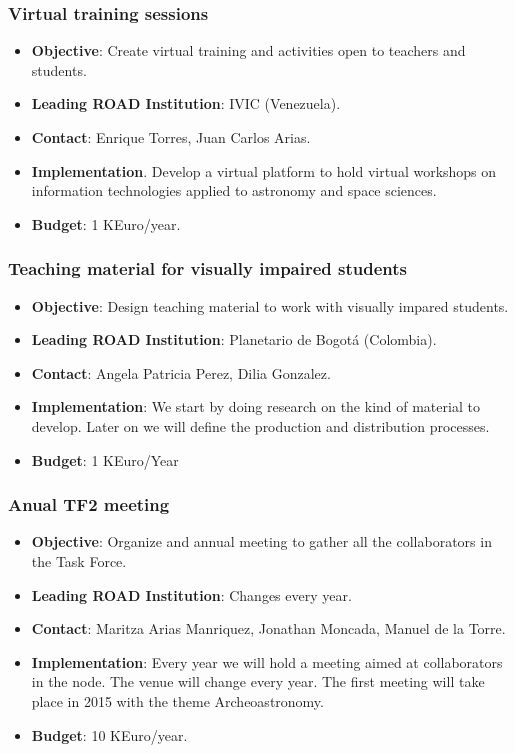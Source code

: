 \documentclass[12pt]{article}
\begin{document}
\subsubsection{Virtual training sessions}
\begin{itemize}
\item {\bf Objective}: Create virtual training and activities open to
  teachers and students. 
\item {\bf Leading ROAD Institution}: IVIC (Venezuela).
\item {\bf Contact}: Enrique Torres, Juan Carlos Arias.
\item {\bf Implementation}. Develop a virtual platform to hold virtual
  workshops on information technologies applied to astronomy and space
  sciences.
\item {\bf Budget}: 1 KEuro/year.
\end{itemize}

\subsubsection{Teaching material for visually impaired students}
\begin{itemize}
\item {\bf Objective}: Design teaching material to work with visually
  impared students. 
\item {\bf Leading ROAD Institution}: Planetario de Bogot\'a
  (Colombia). 
\item {\bf Contact}: Angela Patricia Perez, Dilia Gonzalez. 
\item {\bf Implementation}: We start by doing research on the kind of
  material to develop. Later on we will define the production and
  distribution processes.  
\item {\bf Budget}: 1 KEuro/Year
\end{itemize}

\subsubsection{Anual TF2 meeting}
\begin{itemize}
\item {\bf Objective}:  Organize and annual meeting to gather all the
  collaborators in the Task Force.
\item {\bf Leading ROAD Institution}: Changes every year.
\item {\bf Contact}: Maritza Arias Manriquez, Jonathan Moncada,  Manuel
  de la Torre.
\item {\bf Implementation}: 
Every year we will hold a meeting aimed at collaborators in the
node. The venue will change every year. The first meeting will take
place in 2015 with the theme Archeoastronomy.
\item {\bf Budget}: 10 KEuro/year.
\end{itemize}
\end{document}

